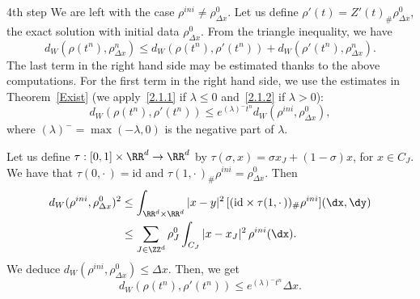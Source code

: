 \begin{step}{4th step}%
We are left with the case $\rho^{ini}\neq \rho_{\Delta x}^0$. Let us define $\rho'(t)=Z'(t)_\#\rho_{\Delta x}^0$, the exact solution with initial data $\rho_{\Delta x}^0$. From the triangle inequality, we have
\[
d_W(\rho(t^n),\rho_{\Delta x}^n) \leq d_W(\rho(t^n),\rho'(t^n)) + d_W(\rho'(t^n),\rho_{\Delta x}^n).
\]
The last term in the right hand side may be estimated thanks to the above computations. For the first term in the right hand side, we use the estimates in Theorem~\ref{Exist} (we apply~\eqref{2.1.1} if $\lambda \leq 0$ and~\eqref{2.1.2} if $\lambda >0$):
\[
d_W(\rho(t^n),\rho'(t^n)) \leq e^{(\lambda)^{-} t^n} d_W(\rho^{ini},\rho_{\Delta x}^0),
\]
where $(\lambda)^{-}=\max(-\lambda,0)$ is the negative part of $\lambda$.

Let us define $\tau:[0,1]\times \RR^d \to \RR^d$ by $\tau(\sigma,x) = \sigma x_J + (1-\sigma)x$, for $x \in C_J$. We have that $\tau(0,{\cdot\,})=\mathrm{id}$ and $\tau(1,{\cdot\,})_\# \rho^{ini} = \rho_{\Delta x}^0$. Then
\begin{equation}\label{eq:wp:condition:initiale}
\begin{split}
d_W(\rho^{ini},\rho_{\Delta x}^0)^2 &\leq 
\int_{\RR^d\times \RR^d} |x-y|^2 \, [(\mathrm{id}\times\tau(1,{\cdot\,}))_\# \rho^{ini}](\dx,\dy)
\\
& \leq  \sum_{J\in \ZZ^d} \rho_J^0 \int_{C_J} |x-x_J|^2 \,\rho^{ini}(\dx).
\end{split}
\end{equation}
We deduce $d_W(\rho^{ini},\rho_{\Delta x}^0) \leq \Delta x$. Then, we get
\[
d_W(\rho(t^n),\rho'(t^n)) \leq e^{(\lambda)^- t^n} \Delta x.
\]
\end{step}


